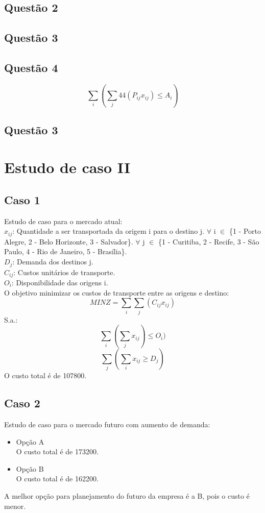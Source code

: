 \documentclass[a4paper,oneside]{article}
\begin{document}
\subsection{Questão 2}
\subsection{Questão 3}
\subsection{Questão 4}

\begin{equation}
    \sum_{i} ( \sum_{j}  44(P_{ij}x_{ij}) \leq  A_i)
\end{equation}
\subsection{Questão 3}
\section {Estudo de caso II}

\subsection{Caso 1}
Estudo de caso para o mercado atual:\\
$x_{ij}$: Quantidade a ser transportada da origem i para o destino j. $\forall$ i $\in$ \{1 - Porto Alegre, 2 - Belo Horizonte, 3 - Salvador\}. $\forall$ j $\in$  \{1 - Curitiba, 2 - Recife, 3 - São Paulo, 4 - Rio de Janeiro, 5 - Brasília\}.
\\
$D_j$: Demanda dos destinos j.
\\
$C_{ij}$: Custos unitários de transporte.
\\
$O_i$: Disponibilidade das origens i.
\\
O objetivo minimizar os custos de transporte entre as origens e destino:
\begin{equation}
  MIN Z =  \sum_{i}\sum_{j} (C_{ij}x_{ij})
\end{equation}
S.a.:
\begin{equation}
    \sum_{i}(\sum_{j} x_{ij}) \leq  O_{i} )
\end{equation}
\begin{equation}
      \sum_{j} (\sum_{i}x_{ij} \geq D_{j})
\end{equation}
O custo total é de 107800.
\subsection{Caso 2}
Estudo de caso para o mercado futuro com aumento de demanda:
\begin{itemize}
\item{Opção A}\\
O custo total é de 173200.
\item{Opção B}\\
O custo total é de 162200.
\end{itemize}
A melhor opção para planejamento do futuro da empresa é a B, pois o custo é menor.
\end{document}
